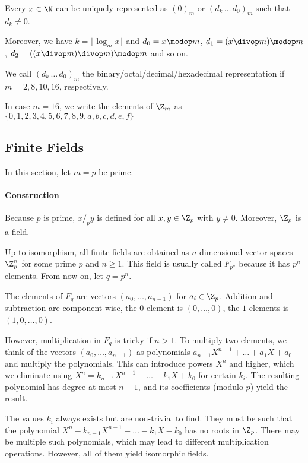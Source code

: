 \begin{theorem}\label{thm:math:base}
Every $x\in\N$ can be uniquely represented as $(0)_m$ or $(d_k\,\ldots\,d_0)_m$ such that $d_k\neq 0$.

Moreover, we have $k=\lfloor \log_m x \rfloor$ and  $d_0=x\modop m$, $d_1=(x\divop m)\modop m$, $d_2=((x\divop m)\divop m)\modop m$ and so on.
\end{theorem}

\begin{example}
We call $(d_k\,\ldots\,d_0)_m$ the binary/octal/decimal/hexadecimal representation if $m=2,8,10,16$, respectively.

In case $m=16$, we write the elements of $\Z_m$ as $\{0,1,2,3,4,5,6,7,8,9,a,b,c,d,e,f\}$
\end{example}

\subsection{Finite Fields}\label{sec:math:finfield}

In this section, let $m=p$ be prime.

\paragraph{Construction}
Because $p$ is prime, $x/_p y$ is defined for all $x,y\in\Z_p$ with $y\neq 0$.
Moreover, $\Z_p$ is a field.

Up to isomorphism, all finite fields are obtained as $n$-dimensional vector spaces $\Z_p^n$ for some prime $p$ and $n\geq 1$.
This field is usually called $F_{p^n}$ because it has $p^n$ elements.
From now on, let $q=p^n$.

The elements of $F_q$ are vectors $(a_0,\ldots,a_{n-1})$ for $a_i\in\Z_p$.
Addition and subtraction are component-wise, the $0$-element is $(0,\ldots,0)$, the $1$-elements is $(1,0,\ldots,0)$.

However, multiplication in $F_q$ is tricky if $n>1$.
To multiply two elements, we think of the vectors $(a_0,\ldots,a_{n-1})$ as polynomials $a_{n-1}X^{n-1}+\ldots+a_1X+a_0$ and multiply the polynomials.
This can introduce powers $X^n$ and higher, which we eliminate using $X^n=k_{n-1}X^{n-1}+\ldots+k_1X+k_0$ for certain $k_i$.
The resulting polynomial has degree at most $n-1$, and its coefficients (modulo $p$) yield the result.

The values $k_i$ always exists but are non-trivial to find.
They must be such that the polynomial $X^n-k_{n-1}X^{n-1}-\ldots-k_1X-k_0$ has no roots in $\Z_p$.
There may be multiple such polynomials, which may lead to different multiplication operations.
However, all of them yield isomorphic fields.


